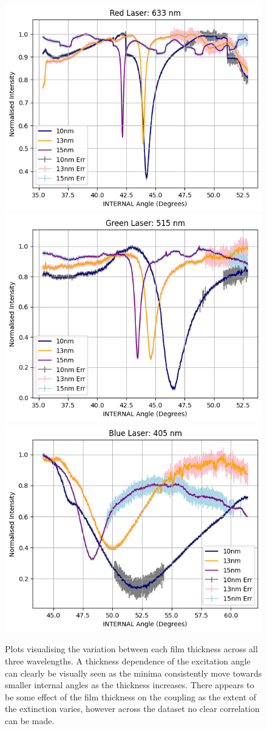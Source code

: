 \documentclass[%
reprint,
amsmath,amssymb,
aps,
]{revtex4-2}
\begin{document}
			\begin{figure}[H]
				\includegraphics[width=0.75\columnwidth]{redThicknessVariation.png}
				\includegraphics[width=0.75\columnwidth]{greenThicknessVariation.png}
				\includegraphics[width=0.75\columnwidth]{blueThicknessVariation.png}
				\caption{\label{fig:thicknessVariation}Plots visualising the variation between each film thickness across all three wavelengths. A thickness dependence of the excitation angle can clearly be visually seen as the minima consistently move towards smaller internal angles as the thickness increases. There appears to be some effect of the film thickness on the coupling as the extent of the extinction varies, however across the dataset no clear correlation can be made.}
			\end{figure}
	
\end{document}
